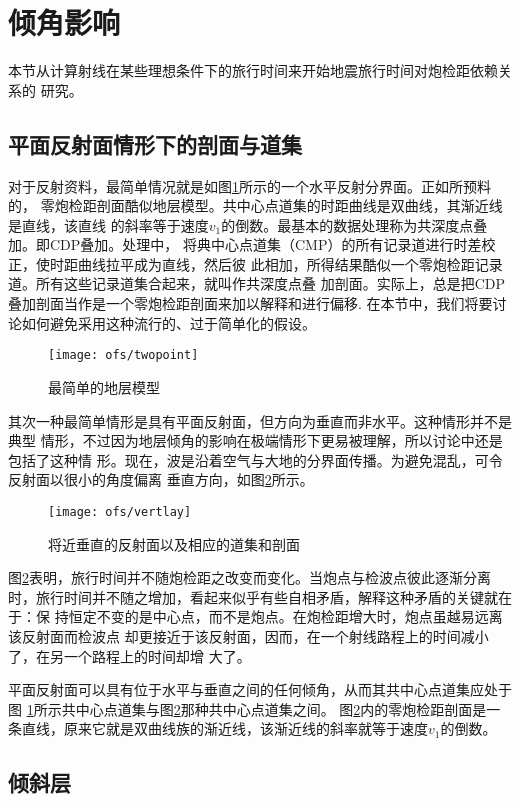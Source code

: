 \section{倾角影响}
\label{sec:3.2}

本节从计算射线在某些理想条件下的旅行时间来开始地震旅行时间对炮检距依赖关系的
研究。

\subsection{平面反射面情形下的剖面与道集}
\label{sec:3.2.1}

对于反射资料，最简单情况就是如图\ref{fig:ofs/twopoint}所示的一个水平反射分界面。正如所预料的，
零炮检距剖面酷似地层模型。共中心点道集的时距曲线是双曲线，其渐近线是直线，该直线
的斜率等于速度$v_1$的倒数。最基本的数据处理称为共深度点叠加。即CDP叠加。处理中，
将典中心点道集（CMP）的所有记录道进行时差校正，使时距曲线拉平成为直线，然后彼
此相加，所得结果酷似一个零炮检距记录道。所有这些记录道集合起来，就叫作共深度点叠
加剖面。实际上，总是把CDP叠加剖面当作是一个零炮检距剖面来加以解释和进行偏移.
在本节中，我们将要讨论如何避免采用这种流行的、过于简单化的假设。

\begin{figure}[H]
\centering
\texttt{[image: ofs/twopoint]}
\caption[twopoint]{最简单的地层模型}
\label{fig:ofs/twopoint}
\end{figure}

其次一种最简单情形是具有平面反射面，但方向为垂直而非水平。这种情形并不是典型
情形，不过因为地层倾角的影响在极端情形下更易被理解，所以讨论中还是包括了这种情
形。现在，波是沿着空气与大地的分界面传播。为避免混乱，可令反射面以很小的角度偏离
垂直方向，如图\ref{fig:ofs/vertlay}所示。

\begin{figure}[H]
\centering
\texttt{[image: ofs/vertlay]}
\caption[vertlay]{将近垂直的反射面以及相应的道集和剖面}
\label{fig:ofs/vertlay}
\end{figure}

图\ref{fig:ofs/vertlay}表明，旅行时间并不随炮检距之改变而变化。当炮点与检波点彼此逐渐分离
时，旅行时间并不随之增加，看起来似乎有些自相矛盾，解释这种矛盾的关键就在于：保
持恒定不变的是中心点，而不是炮点。在炮检距增大时，炮点虽越易远离该反射面而检波点
却更接近于该反射面，因而，在一个射线路程上的时间减小了，在另一个路程上的时间却增
大了。

平面反射面可以具有位于水平与垂直之间的任何倾角，从而其共中心点道集应处于图
\ref{fig:ofs/twopoint}所示共中心点道集与图\ref{fig:ofs/vertlay}那种共中心点道集之间。
图\ref{fig:ofs/vertlay}内的零炮检距剖面是一条直线，原来它就是双曲线族的渐近线，该渐近线的斜率就等于速度$v_1$的倒数。

\subsection{倾斜层}
\label{sec:3.2.2}
